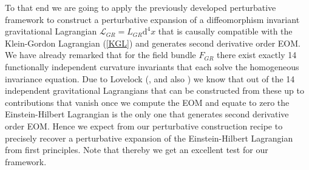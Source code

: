 \documentclass[a4paper,12pt, DIV=14, BCOR=5mm, twoside, headsepline, numbers=noenddot]{scrbook}
\begin{document}
To that end we are going to apply the previously developed perturbative framework to construct a perturbative expansion of a diffeomorphism invariant gravitational Lagrangian $\mathcal{L}_{GR} = L_{GR} \mathrm{d}^4x$ that is causally compatible with the Klein-Gordon Lagrangian (\ref{KGL}) and generates second derivative order EOM. 
We have already remarked that for the field bundle $F_{GR}$ there exist exactly 14 functionally independent curvature invariants that each solve the homogeneous invariance equation. Due to Lovelock (\cite{Lovelock1969}, \cite{doi:10.1063/1.1665613} and also \cite{doi:10.1063/1.1666069}) we know that out of the 14 independent gravitational Lagrangians that can be constructed from these up to contributions that vanish once we compute the EOM and equate to zero the Einstein-Hilbert Lagrangian is the only one that generates second derivative order EOM. 
Hence we expect from our perturbative construction recipe to precisely recover a perturbative expansion of the Einstein-Hilbert Lagrangian from first principles. Note that thereby we get an excellent test for our framework. \\
\end{document}

